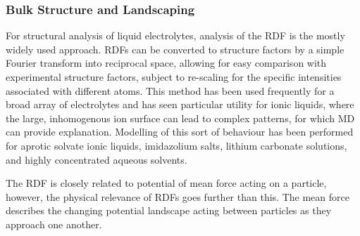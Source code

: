 \documentclass[../main.tex]{subfiles}
\begin{document}
\subsubsection{Bulk Structure and Landscaping}
\label{sec:electrolytes_bulk_structure}
For structural analysis of liquid electrolytes, analysis of the RDF is the mostly widely used approach.  RDFs can be converted to structure factors by a simple Fourier transform into reciprocal space, allowing for easy comparison with experimental structure factors,\cite{shimizu_structural_2015, pethes_comparison_2017, hanke_intermolecular_2001,tsuzuki_molecular_2009} subject to re-scaling for the specific intensities associated with different atoms. This method has been used frequently for a broad array of electrolytes and has seen particular utility for ionic liquids, where the large, inhomogenous ion surface can lead to complex patterns, for which MD can provide explanation. Modelling of this sort of behaviour has been performed for aprotic\cite{Migliorati_2015} solvate ionic liquids,\cite{shimizu_structural_2015} imidazolium salts,\cite{hanke_intermolecular_2001} lithium carbonate solutions,\cite{Chaudhari_2018} and highly concentrated aqueous solvents.\cite{pethes_comparison_2017}

The RDF is closely related to potential of mean force acting on a particle, however, the physical relevance of RDFs goes further than this. The mean force describes the changing potential landscape acting between particles as they approach one another.\cite{frenkel_understanding_2002} \cite{smith_electrostatic_2016,gaddam2019electrostatic,coles_correlation_2020,zeman2020bulk,krucker2021underscreening,jeanmairet2019study,cats2021primitive}
\end{document}
